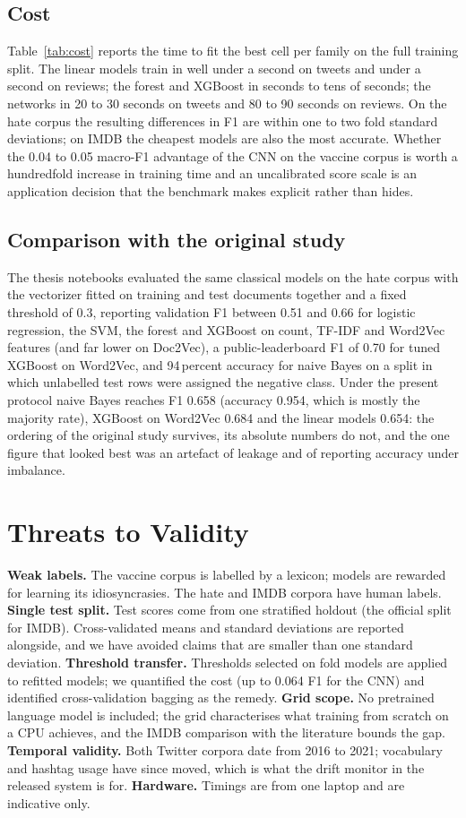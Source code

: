 \documentclass[journal,10pt]{IEEEtran}
\begin{document}
\subsection{Cost}

Table~\ref{tab:cost} reports the time to fit the best cell per family on the full training split. The linear models train in well under a second on tweets and under a second on reviews; the forest and XGBoost in seconds to tens of seconds; the networks in 20 to 30 seconds on tweets and 80 to 90 seconds on reviews. On the hate corpus the resulting differences in F1 are within one to two fold standard deviations; on IMDB the cheapest models are also the most accurate. Whether the 0.04 to 0.05 macro-F1 advantage of the CNN on the vaccine corpus is worth a hundredfold increase in training time and an uncalibrated score scale is an application decision that the benchmark makes explicit rather than hides.

\subsection{Comparison with the original study}
The thesis notebooks evaluated the same classical models on the hate corpus with the vectorizer fitted on training and test documents together and a fixed threshold of 0.3, reporting validation F1 between 0.51 and 0.66 for logistic regression, the SVM, the forest and XGBoost on count, TF-IDF and Word2Vec features (and far lower on Doc2Vec), a public-leaderboard F1 of 0.70 for tuned XGBoost on Word2Vec, and 94\,percent accuracy for naive Bayes on a split in which unlabelled test rows were assigned the negative class. Under the present protocol naive Bayes reaches F1 0.658 (accuracy 0.954, which is mostly the majority rate), XGBoost on Word2Vec 0.684 and the linear models 0.654: the ordering of the original study survives, its absolute numbers do not, and the one figure that looked best was an artefact of leakage and of reporting accuracy under imbalance.

\section{Threats to Validity}
\textbf{Weak labels.} The vaccine corpus is labelled by a lexicon; models are rewarded for learning its idiosyncrasies. The hate and IMDB corpora have human labels.
\textbf{Single test split.} Test scores come from one stratified holdout (the official split for IMDB). Cross-validated means and standard deviations are reported alongside, and we have avoided claims that are smaller than one standard deviation.
\textbf{Threshold transfer.} Thresholds selected on fold models are applied to refitted models; we quantified the cost (up to 0.064 F1 for the CNN) and identified cross-validation bagging as the remedy.
\textbf{Grid scope.} No pretrained language model is included; the grid characterises what training from scratch on a CPU achieves, and the IMDB comparison with the literature bounds the gap.
\textbf{Temporal validity.} Both Twitter corpora date from 2016 to 2021; vocabulary and hashtag usage have since moved, which is what the drift monitor in the released system is for.
\textbf{Hardware.} Timings are from one laptop and are indicative only.
\end{document}
